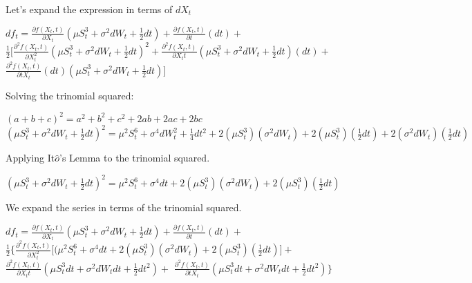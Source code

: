 \documentclass[12pt]{article}
\begin{document}
Let's expand the expression in terms of $dX_t$\\

\begin{center}

${df_t =  \frac{\partial f(X_t,t)}{\partial X_t}(\mu S_t^{3} + \sigma^{2}dW_t + \frac{1}{2}dt) + \frac{\partial f(X_t,t)}{\partial t}(dt) +}$\\
${\frac{1}{2}\Big[\frac{\partial^2 f(X_t,t)}{\partial X_t^2}(\mu S_t^{3} + \sigma^{2}dW_t + \frac{1}{2}dt)^2+\frac{\partial^2 f(X_t,t)}{\partial X_t t}(\mu S_t^{3} + \sigma^{2}dW_t + \frac{1}{2}dt)(dt)+}$
${\frac{\partial^2 f(X_t,t)}{\partial t X_t}(dt)(\mu S_t^{3} + \sigma^{2}dW_t + \frac{1}{2}dt)\Big]}$

\end{center}

\hfill

Solving the trinomial squared:\\

\begin{center}

$(a+b+c)^2=a^2+b^2+c^2+2ab+2ac+2bc $\\

 $(\mu S_t^{3} + \sigma^{2}dW_t + \frac{1}{2}dt)^2 = \mu^2 S_t^{6} + \sigma^{4}dW_t^2 
 + \frac{1}{4}dt^2 + 2(\mu S_t^{3})(\sigma^{2}dW_t) + 2(\mu S_t^{3})(\frac{1}{2}dt) + 2(\sigma^{2}dW_t)(\frac{1}{2}dt)
$  
\end{center}
Applying  It$\hat{o}$'s Lemma to the trinomial squared.
\begin{center}
 $(\mu S_t^{3} + \sigma^{2}dW_t + \frac{1}{2}dt)^2 = \mu^2 S_t^{6} + \sigma^{4}dt + 2(\mu S_t^{3})(\sigma^{2}dW_t) + 2(\mu S_t^{3})(\frac{1}{2}dt) 
$  
\end{center}

We expand the series in terms of the trinomial squared.
\begin{center}
${df_t =  \frac{\partial f(X_t,t)}{\partial X_t}(\mu S_t^{3} + \sigma^{2}dW_t + \frac{1}{2}dt) + \frac{\partial f(X_t,t)}{\partial t}(dt) +}$\\
${\frac{1}{2}\Big\{\frac{\partial^2 f(X_t,t)}{\partial X_t^2}\Big[(\mu^2 S_t^{6} + \sigma^{4}dt 
+ 2(\mu S_t^{3})(\sigma^{2}dW_t) + 2(\mu S_t^{3})(\frac{1}{2}dt)\Big] +}$\\
 ${\frac{\partial^2 f(X_t,t)}{\partial X_t t}(\mu S_t^{3}dt + \sigma^{2}dW_t dt + \frac{1}{2}dt^2)+}$
${\frac{\partial^2 f(X_t,t)}{\partial t X_t}(\mu S_t^{3}dt + \sigma^{2}dW_t dt + \frac{1}{2}dt^2)\Big\}}$

\end{center}
\end{document}
